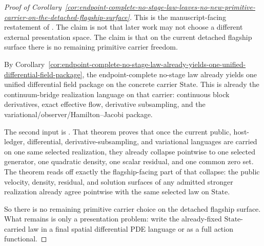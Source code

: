 \begin{proof}[Proof of Corollary~\ref{cor:endpoint-complete-no-stage-law-leaves-no-new-primitive-carrier-on-the-detached-flagship-surface}]
\label{proof:cor:endpoint-complete-no-stage-law-leaves-no-new-primitive-carrier-on-the-detached-flagship-surface}
This is the manuscript-facing restatement of
.
The claim is not that later work may not choose a different external
presentation space. The claim is that on the current detached flagship surface
there is no remaining primitive carrier freedom.

By Corollary~\ref{cor:endpoint-complete-no-stage-law-already-yields-one-unified-differential-field-package},
the endpoint-complete no-stage law already yields one unified differential
field package on the concrete carrier \(\mathrm{State}\). This is already the
continuum-bridge realization language on that carrier: continuous block derivatives,
exact effective flow, derivative subsampling, and the
variational/observer/Hamilton--Jacobi package.

The second input is
.
That theorem proves that once the current public, host-ledger, differential,
derivative-subsampling, and variational languages are carried on one same
selected realization, they already collapse pointwise to one selected
generator, one quadratic density, one scalar residual, and one common zero
set. The theorem
reads off exactly the flagship-facing part of that collapse: the public
velocity, density, residual, and solution surfaces of any admitted stronger
realization already agree pointwise with the same selected law on
\(\mathrm{State}\).

So there is no remaining primitive carrier choice on the detached flagship
surface. What remains is only a presentation problem: write the already-fixed
\(\mathrm{State}\)-carried law in a final spatial differential PDE language or
as a full action functional.
\end{proof}

